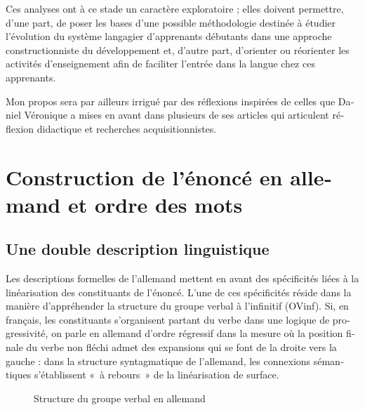 \documentclass[output=paper]{langscibook}
\begin{document}
\begin{otherlanguage}{french}
\begin{sloppypar}
Ces analyses ont à ce stade un caractère exploratoire ; elles doivent permettre, d’une part, de poser les bases d’une possible méthodologie destinée à étudier l’évolution du système langagier d’apprenants débutants dans une approche constructionniste du développement et, d’autre part, d'orienter ou réorienter les activités d’enseignement afin de faciliter l’entrée dans la langue chez ces apprenants. 
\end{sloppypar}

Mon propos sera par ailleurs irrigué par des réflexions inspirées de celles que Daniel Véronique a mises en avant dans plusieurs de ses articles qui articulent réflexion didactique et recherches acquisitionnistes.

\section{Construction de l’énoncé en allemand et ordre des mots}\label{sec:felce:2}
\subsection{Une double description linguistique}\label{sec:felce:2.1}

Les descriptions formelles de l’allemand mettent en avant des spécificités liées à la linéarisation des constituants de l’énoncé. L’une de ces spécificités réside dans la manière d’appréhender la structure du groupe verbal à l’infinitif (OVinf). Si, en français, les constituants s’organisent partant du verbe dans une logique de progressivité, on parle en allemand d’ordre régressif dans la mesure où la position finale du verbe non fléchi admet des expansions qui se font de la droite vers la gauche : dans la structure syntagmatique de l’allemand, les connexions sémantiques s’établissent «~à rebours~» de la linéarisation de surface. 


\begin{figure}
\caption{Structure du groupe verbal en allemand\label{fig:felce:1}}
\end{figure}


\end{otherlanguage}
\end{document}
